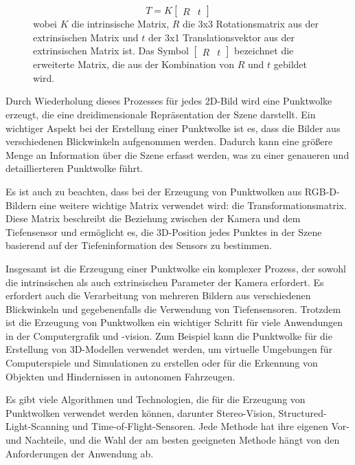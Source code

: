 \cite{SWB-470983582}

\begin{figure}
\begin{equation*}
T = K \begin{bmatrix}R & t\end{bmatrix}
\end{equation*}
wobei $K$ die intrinsische Matrix, $R$ die 3x3 Rotationsmatrix aus der extrinsischen Matrix und $t$ der 3x1 Translationsvektor aus der extrinsischen Matrix ist. Das Symbol $\begin{bmatrix}R & t\end{bmatrix}$ bezeichnet die erweiterte Matrix, die aus der Kombination von $R$ und $t$ gebildet wird.
\end{figure}

Durch Wiederholung dieses Prozesses für jedes 2D-Bild wird eine Punktwolke erzeugt, die eine dreidimensionale Repräsentation der Szene darstellt. Ein wichtiger Aspekt bei der Erstellung einer Punktwolke ist es, dass die Bilder aus verschiedenen Blickwinkeln aufgenommen werden. Dadurch kann eine größere Menge an Information über die Szene erfasst werden, was zu einer genaueren und detaillierteren Punktwolke führt.

Es ist auch zu beachten, dass bei der Erzeugung von Punktwolken aus \ac{RGB-D}-Bildern eine weitere wichtige Matrix verwendet wird: die Transformationsmatrix. Diese Matrix beschreibt die Beziehung zwischen der Kamera und dem Tiefensensor und ermöglicht es, die 3D-Position jedes Punktes in der Szene basierend auf der Tiefeninformation des Sensors zu bestimmen.

Insgesamt ist die Erzeugung einer Punktwolke ein komplexer Prozess, der sowohl die intrinsischen als auch extrinsischen Parameter der Kamera erfordert. Es erfordert auch die Verarbeitung von mehreren Bildern aus verschiedenen Blickwinkeln und gegebenenfalls die Verwendung von Tiefensensoren. Trotzdem ist die Erzeugung von Punktwolken ein wichtiger Schritt für viele Anwendungen in der Computergrafik und -vision. Zum Beispiel kann die Punktwolke für die Erstellung von 3D-Modellen verwendet werden, um virtuelle Umgebungen für Computerspiele und Simulationen zu erstellen oder für die Erkennung von Objekten und Hindernissen in autonomen Fahrzeugen.

Es gibt viele Algorithmen und Technologien, die für die Erzeugung von Punktwolken verwendet werden können, darunter Stereo-Vision, Structured-Light-Scanning und Time-of-Flight-Sensoren. Jede Methode hat ihre eigenen Vor- und Nachteile, und die Wahl der am besten geeigneten Methode hängt von den Anforderungen der Anwendung ab.



